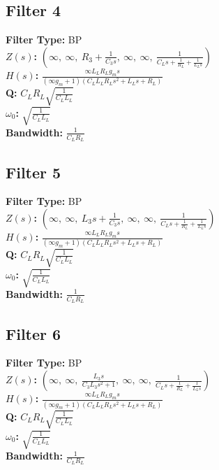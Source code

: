 \documentclass{article}
\begin{document}
\subsection*{Filter 4}
\textbf{Filter Type:} BP \\ 
\textbf{$Z(s)$:} $\left( \infty, \  \infty, \  R_{3} + \frac{1}{C_{3} s}, \  \infty, \  \infty, \  \frac{1}{C_{L} s + \frac{1}{R_{L}} + \frac{1}{L_{L} s}}\right)$ \\ 
\textbf{$H(s)$:} $\frac{\infty L_{L} R_{L} g_{m} s}{\left(\infty g_{m} + 1\right) \left(C_{L} L_{L} R_{L} s^{2} + L_{L} s + R_{L}\right)}$ \\ 
\textbf{Q:} $C_{L} R_{L} \sqrt{\frac{1}{C_{L} L_{L}}}$ \\ 
\textbf{$\omega_0$:} $\sqrt{\frac{1}{C_{L} L_{L}}}$ \\ 
\textbf{Bandwidth:} $\frac{1}{C_{L} R_{L}}$ \\ 
\subsection*{Filter 5}
\textbf{Filter Type:} BP \\ 
\textbf{$Z(s)$:} $\left( \infty, \  \infty, \  L_{3} s + \frac{1}{C_{3} s}, \  \infty, \  \infty, \  \frac{1}{C_{L} s + \frac{1}{R_{L}} + \frac{1}{L_{L} s}}\right)$ \\ 
\textbf{$H(s)$:} $\frac{\infty L_{L} R_{L} g_{m} s}{\left(\infty g_{m} + 1\right) \left(C_{L} L_{L} R_{L} s^{2} + L_{L} s + R_{L}\right)}$ \\ 
\textbf{Q:} $C_{L} R_{L} \sqrt{\frac{1}{C_{L} L_{L}}}$ \\ 
\textbf{$\omega_0$:} $\sqrt{\frac{1}{C_{L} L_{L}}}$ \\ 
\textbf{Bandwidth:} $\frac{1}{C_{L} R_{L}}$ \\ 
\subsection*{Filter 6}
\textbf{Filter Type:} BP \\ 
\textbf{$Z(s)$:} $\left( \infty, \  \infty, \  \frac{L_{3} s}{C_{3} L_{3} s^{2} + 1}, \  \infty, \  \infty, \  \frac{1}{C_{L} s + \frac{1}{R_{L}} + \frac{1}{L_{L} s}}\right)$ \\ 
\textbf{$H(s)$:} $\frac{\infty L_{L} R_{L} g_{m} s}{\left(\infty g_{m} + 1\right) \left(C_{L} L_{L} R_{L} s^{2} + L_{L} s + R_{L}\right)}$ \\ 
\textbf{Q:} $C_{L} R_{L} \sqrt{\frac{1}{C_{L} L_{L}}}$ \\ 
\textbf{$\omega_0$:} $\sqrt{\frac{1}{C_{L} L_{L}}}$ \\ 
\textbf{Bandwidth:} $\frac{1}{C_{L} R_{L}}$ \\ 
\end{document}
